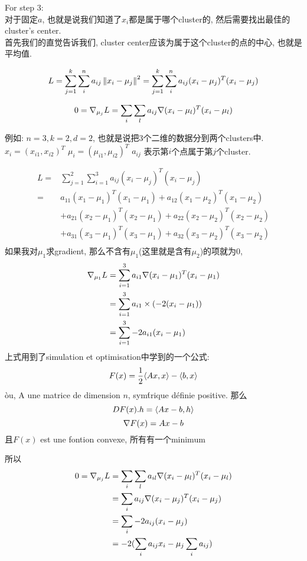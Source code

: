 \documentclass{article}
\begin{document}
\begin{itemize}
\begin{itemize}
For step 3:\\
对于固定$a$, 也就是说我们知道了$x_i$都是属于哪个cluster的, 然后需要找出最佳的cluster's center.\\
首先我们的直觉告诉我们, cluster center应该为属于这个cluster的点的中心, 也就是平均值.

$$
\begin{aligned}
\end{aligned}
L 
= \sum_{j = 1}^k \sum_i^n a_{ij}\left\Vert x_i - \mu_j\right\Vert^2
= \sum_{j = 1}^k \sum_i^n a_{ij}(x_i - \mu_j)^T (x_i - \mu_j)
$$

$$
0 = \nabla _{\mu_j}{L} = \sum_i \sum_l a_{ij} \nabla (x_i - \mu_l)^T (x_i - \mu_l)
$$

例如: $n=3, k=2, d=2$, 也就是说把3个二维的数据分到两个clusters中.\\
$x_i = (x_{i1}, x_{i2})^T$
$\mu_i = (\mu_{i1}, \mu_{i2})^T$
$a_{ij}$ 表示第$i$个点属于第$j$个cluster.

$$
\begin{aligned}
L
= & \sum_{j = 1}^2 \sum_{i=1}^3 a_{ij}(x_i - \mu_j)^T (x_i - \mu_j) \\
= &  a_{11}(x_1 - \mu_1)^T (x_1 - \mu_1) + a_{12}(x_1 - \mu_2)^T (x_1 - \mu_2) \\
& + a_{21}(x_2 - \mu_1)^T (x_2 - \mu_1) + a_{22}(x_2 - \mu_2)^T (x_2 - \mu_2) \\
& + a_{31}(x_3 - \mu_1)^T (x_3 - \mu_1) + a_{32}(x_3 - \mu_2)^T (x_3 - \mu_2) \\
\end{aligned}
$$
如果我对$\mu_1$求gradient, 那么不含有$\mu_1$(这里就是含有$\mu_2$)的项就为0,
$$
\begin{aligned}
\nabla _{\mu_1}{L} 
& = \sum_{i = 1}^3 a_{i1}\nabla (x_i - \mu_1)^T (x_i - \mu_1) \\
& = \sum_{i = 1}^3 a_{i1} \times (-2(x_i - \mu_1)) \\
& = \sum_{i = 1}^3  -2a_{i1}(x_i - \mu_1) \\
\end{aligned}
$$
上式用到了simulation et optimisation中学到的一个公式:
$$
F(x)= \frac{1}{2} \langle Ax , x\rangle - \langle b , x\rangle
$$
\`ou, A une matrice de dimension $n$, sym\'trique d\'efinie positive. 那么
$$DF(x).h = \langle Ax - b , h\rangle$$
$$\nabla F(x) = Ax - b$$
且$F(x)$ est une fontion convexe, 所有有一个minimum

所以
$$
\begin{aligned}
0 = \nabla _{\mu_j}{L} 
&= \sum_i \sum_l a_{il} \nabla (x_i - \mu_l)^T (x_i - \mu_l) \\
&= \sum_i a_{ij} \nabla (x_i - \mu_j)^T (x_i - \mu_j) \\
&= \sum_i -2a_{ij} (x_i - \mu_j) \\
&= -2(\sum_i a_{ij}x_i - \mu_j \sum_i a_{ij})
\end{aligned}
$$


\end{itemize}
\end{itemize}
\end{document}
